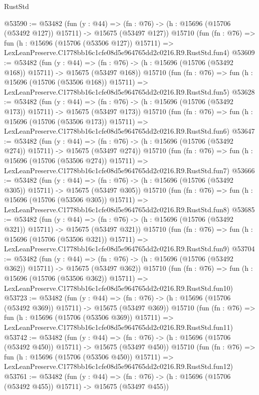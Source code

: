\begin{lexlean}{RustStd}
\begin{coremodule}
@53590 := @53482
    (fun (y : @44) =>
    (fn : @76) -> (h : @15696 (@15706 (@53492 @127)) @15711) -> @15675 (@53497 @127))
    @15710
    (fun (fn : @76) =>
    fun (h : @15696 (@15706 (@53506 @127)) @15711) =>
    LexLeanPreserve.C1778bb16c1cfe08d5e964765dd2c0216.R9.RustStd.fun4)
@53609 := @53482
    (fun (y : @44) =>
    (fn : @76) -> (h : @15696 (@15706 (@53492 @168)) @15711) -> @15675 (@53497 @168))
    @15710
    (fun (fn : @76) =>
    fun (h : @15696 (@15706 (@53506 @168)) @15711) =>
    LexLeanPreserve.C1778bb16c1cfe08d5e964765dd2c0216.R9.RustStd.fun5)
@53628 := @53482
    (fun (y : @44) =>
    (fn : @76) -> (h : @15696 (@15706 (@53492 @173)) @15711) -> @15675 (@53497 @173))
    @15710
    (fun (fn : @76) =>
    fun (h : @15696 (@15706 (@53506 @173)) @15711) =>
    LexLeanPreserve.C1778bb16c1cfe08d5e964765dd2c0216.R9.RustStd.fun6)
@53647 := @53482
    (fun (y : @44) =>
    (fn : @76) -> (h : @15696 (@15706 (@53492 @274)) @15711) -> @15675 (@53497 @274))
    @15710
    (fun (fn : @76) =>
    fun (h : @15696 (@15706 (@53506 @274)) @15711) =>
    LexLeanPreserve.C1778bb16c1cfe08d5e964765dd2c0216.R9.RustStd.fun7)
@53666 := @53482
    (fun (y : @44) =>
    (fn : @76) -> (h : @15696 (@15706 (@53492 @305)) @15711) -> @15675 (@53497 @305))
    @15710
    (fun (fn : @76) =>
    fun (h : @15696 (@15706 (@53506 @305)) @15711) =>
    LexLeanPreserve.C1778bb16c1cfe08d5e964765dd2c0216.R9.RustStd.fun8)
@53685 := @53482
    (fun (y : @44) =>
    (fn : @76) -> (h : @15696 (@15706 (@53492 @321)) @15711) -> @15675 (@53497 @321))
    @15710
    (fun (fn : @76) =>
    fun (h : @15696 (@15706 (@53506 @321)) @15711) =>
    LexLeanPreserve.C1778bb16c1cfe08d5e964765dd2c0216.R9.RustStd.fun9)
@53704 := @53482
    (fun (y : @44) =>
    (fn : @76) -> (h : @15696 (@15706 (@53492 @362)) @15711) -> @15675 (@53497 @362))
    @15710
    (fun (fn : @76) =>
    fun (h : @15696 (@15706 (@53506 @362)) @15711) =>
    LexLeanPreserve.C1778bb16c1cfe08d5e964765dd2c0216.R9.RustStd.fun10)
@53723 := @53482
    (fun (y : @44) =>
    (fn : @76) -> (h : @15696 (@15706 (@53492 @369)) @15711) -> @15675 (@53497 @369))
    @15710
    (fun (fn : @76) =>
    fun (h : @15696 (@15706 (@53506 @369)) @15711) =>
    LexLeanPreserve.C1778bb16c1cfe08d5e964765dd2c0216.R9.RustStd.fun11)
@53742 := @53482
    (fun (y : @44) =>
    (fn : @76) -> (h : @15696 (@15706 (@53492 @450)) @15711) -> @15675 (@53497 @450))
    @15710
    (fun (fn : @76) =>
    fun (h : @15696 (@15706 (@53506 @450)) @15711) =>
    LexLeanPreserve.C1778bb16c1cfe08d5e964765dd2c0216.R9.RustStd.fun12)
@53761 := @53482
    (fun (y : @44) =>
    (fn : @76) -> (h : @15696 (@15706 (@53492 @455)) @15711) -> @15675 (@53497 @455))

\end{coremodule}
\end{lexlean}
